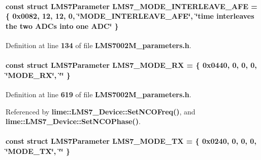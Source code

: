 \paragraph[{L\+M\+S7\+\_\+\+M\+O\+D\+E\+\_\+\+I\+N\+T\+E\+R\+L\+E\+A\+V\+E\+\_\+\+A\+FE}]{\setlength{\rightskip}{0pt plus 5cm}const struct {\bf L\+M\+S7\+Parameter} L\+M\+S7\+\_\+\+M\+O\+D\+E\+\_\+\+I\+N\+T\+E\+R\+L\+E\+A\+V\+E\+\_\+\+A\+FE = \{ 0x0082, 12, 12, 0, \char`\"{}\+M\+O\+D\+E\+\_\+\+I\+N\+T\+E\+R\+L\+E\+A\+V\+E\+\_\+\+A\+F\+E\char`\"{}, \char`\"{}time interleaves the two A\+D\+Cs into one A\+D\+C\char`\"{} \}\hspace{0.3cm}{\ttfamily [static]}}\label{LMS7002M__parameters_8h_a6e5aa128a3ac4e88ef3c5c3bfde5dcec}


Definition at line {\bf 134} of file {\bf L\+M\+S7002\+M\+\_\+parameters.\+h}.

\paragraph[{L\+M\+S7\+\_\+\+M\+O\+D\+E\+\_\+\+RX}]{\setlength{\rightskip}{0pt plus 5cm}const struct {\bf L\+M\+S7\+Parameter} L\+M\+S7\+\_\+\+M\+O\+D\+E\+\_\+\+RX = \{ 0x0440, 0, 0, 0, \char`\"{}\+M\+O\+D\+E\+\_\+\+R\+X\char`\"{}, \char`\"{}\char`\"{} \}\hspace{0.3cm}{\ttfamily [static]}}\label{LMS7002M__parameters_8h_af47e0b1dbea5d3ecff414346b6e53b49}


Definition at line {\bf 619} of file {\bf L\+M\+S7002\+M\+\_\+parameters.\+h}.



Referenced by {\bf lime\+::\+L\+M\+S7\+\_\+\+Device\+::\+Set\+N\+C\+O\+Freq()}, and {\bf lime\+::\+L\+M\+S7\+\_\+\+Device\+::\+Set\+N\+C\+O\+Phase()}.

\paragraph[{L\+M\+S7\+\_\+\+M\+O\+D\+E\+\_\+\+TX}]{\setlength{\rightskip}{0pt plus 5cm}const struct {\bf L\+M\+S7\+Parameter} L\+M\+S7\+\_\+\+M\+O\+D\+E\+\_\+\+TX = \{ 0x0240, 0, 0, 0, \char`\"{}\+M\+O\+D\+E\+\_\+\+T\+X\char`\"{}, \char`\"{}\char`\"{} \}\hspace{0.3cm}{\ttfamily [static]}}\label{LMS7002M__parameters_8h_a8d5b677a3138b98d83786d7551764531}


